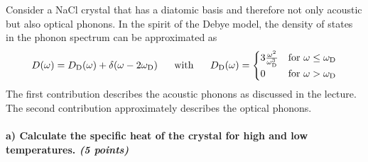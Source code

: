 Consider a NaCl crystal that has a diatomic basis and therefore not only 
acoustic but also optical phonons. In the spirit of the Debye model, the 
density of states in the phonon spectrum can be approximated as
\begin{equation}
    D(\omega)
    =D_\textnormal{D}(\omega)+\delta(\omega-2\omega_\textnormal{D})
    \ \ \ \ \ 
    \textnormal{with}
    \ \ \ \ \ 
    D_\textnormal{D}(\omega)=
    \begin{cases}
        3\frac{\omega^2}{\omega_\textnormal{D}^3} 
        & \textnormal{for } \omega\le\omega_\textnormal{D} \\
        0 & \textnormal{for } \omega>\omega_\textnormal{D}
    \end{cases}
\end{equation}
The first contribution describes the acoustic phonons as discussed in 
the lecture. The second contribution approximately describes the optical 
phonons. 

\paragraph{a) Calculate the specific heat of the crystal for high and 
    low temperatures. \textit{(5 points)}
} \ \\
\\
